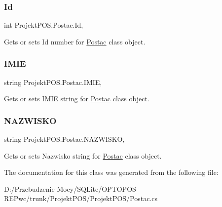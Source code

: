 \subsubsection{\texorpdfstring{Id}{Id}}
{\footnotesize\ttfamily int Projekt\+P\+O\+S.\+Postac.\+Id\hspace{0.3cm}{\ttfamily [get]}, {\ttfamily [set]}}



Gets or sets Id number for \hyperlink{class_projekt_p_o_s_1_1_postac}{Postac} class object. 

\mbox{\label{class_projekt_p_o_s_1_1_postac_adf6ea1a5ed6c787ecffc0dff69385adb}} 
\subsubsection{\texorpdfstring{I\+M\+IE}{IMIE}}
{\footnotesize\ttfamily string Projekt\+P\+O\+S.\+Postac.\+I\+M\+IE\hspace{0.3cm}{\ttfamily [get]}, {\ttfamily [set]}}



Gets or sets I\+M\+IE string for \hyperlink{class_projekt_p_o_s_1_1_postac}{Postac} class object. 

\mbox{\label{class_projekt_p_o_s_1_1_postac_acd714441caa5a6cb52b9ae9628b01c3f}} 
\subsubsection{\texorpdfstring{N\+A\+Z\+W\+I\+S\+KO}{NAZWISKO}}
{\footnotesize\ttfamily string Projekt\+P\+O\+S.\+Postac.\+N\+A\+Z\+W\+I\+S\+KO\hspace{0.3cm}{\ttfamily [get]}, {\ttfamily [set]}}



Gets or sets Nazwisko string for \hyperlink{class_projekt_p_o_s_1_1_postac}{Postac} class object. 



The documentation for this class was generated from the following file\+:\begin{DoxyCompactItemize}
\item 
D\+:/\+Przebudzenie Mocy/\+S\+Q\+Lite/\+O\+P\+T\+O\+P\+O\+S R\+E\+Pwc/trunk/\+Projekt\+P\+O\+S/\+Projekt\+P\+O\+S/Postac.\+cs\end{DoxyCompactItemize}
